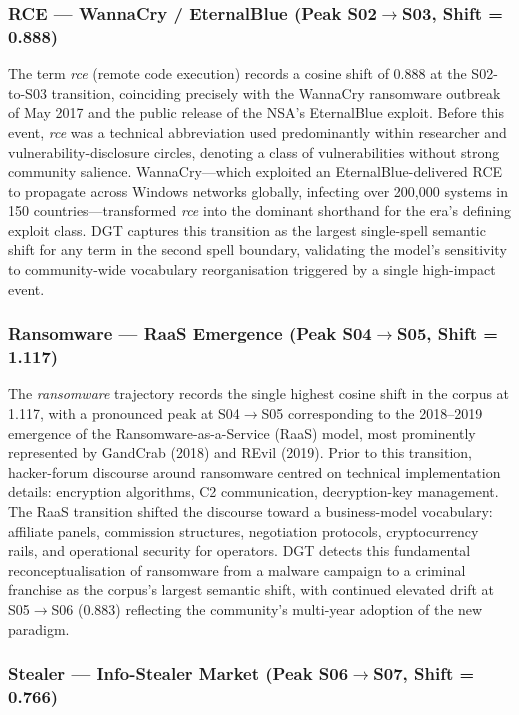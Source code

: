 \documentclass[12pt]{article}
\begin{document}
\subsubsection{RCE --- WannaCry / EternalBlue (Peak S02$\rightarrow$S03, Shift = 0.888)}

The term \textit{rce} (remote code execution) records a cosine shift of 0.888 at the S02-to-S03 transition, coinciding precisely with the WannaCry ransomware outbreak of May 2017 and the public release of the NSA's EternalBlue exploit. Before this event, \textit{rce} was a technical abbreviation used predominantly within researcher and vulnerability-disclosure circles, denoting a class of vulnerabilities without strong community salience. WannaCry---which exploited an EternalBlue-delivered RCE to propagate across Windows networks globally, infecting over 200,000 systems in 150 countries---transformed \textit{rce} into the dominant shorthand for the era's defining exploit class. DGT captures this transition as the largest single-spell semantic shift for any term in the second spell boundary, validating the model's sensitivity to community-wide vocabulary reorganisation triggered by a single high-impact event.

\subsubsection{Ransomware --- RaaS Emergence (Peak S04$\rightarrow$S05, Shift = 1.117)}

The \textit{ransomware} trajectory records the single highest cosine shift in the corpus at 1.117, with a pronounced peak at S04$\rightarrow$S05 corresponding to the 2018--2019 emergence of the Ransomware-as-a-Service (RaaS) model, most prominently represented by GandCrab (2018) and REvil (2019). Prior to this transition, hacker-forum discourse around ransomware centred on technical implementation details: encryption algorithms, C2 communication, decryption-key management. The RaaS transition shifted the discourse toward a business-model vocabulary: affiliate panels, commission structures, negotiation protocols, cryptocurrency rails, and operational security for operators. DGT detects this fundamental reconceptualisation of ransomware from a malware campaign to a criminal franchise as the corpus's largest semantic shift, with continued elevated drift at S05$\rightarrow$S06 (0.883) reflecting the community's multi-year adoption of the new paradigm.

\subsubsection{Stealer --- Info-Stealer Market (Peak S06$\rightarrow$S07, Shift = 0.766)}
\end{document}
